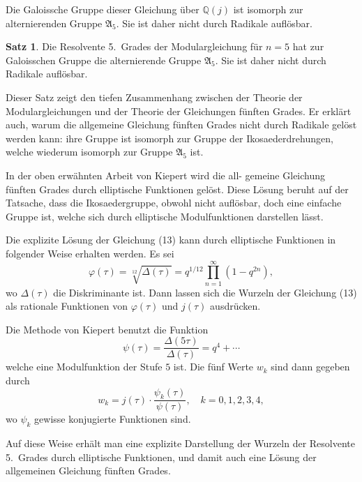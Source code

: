\documentclass[12pt,a4paper]{article}
\theoremstyle{definition}
\newtheorem*{satz}{Satz}
\begin{document}
Die Galoissche Gruppe dieser Gleichung \"uber $\mathbb{Q}(j)$ ist
isomorph zur alternierenden Gruppe $\mathfrak{A}_5$. Sie ist daher
nicht durch Radikale aufl\"osbar.

\begin{satz}
Die Resolvente 5.~Grades der Modulargleichung f\"ur $n = 5$
hat zur Galoisschen Gruppe die alternierende Gruppe $\mathfrak{A}_5$.
Sie ist daher nicht durch Radikale aufl\"osbar.
\end{satz}

Dieser Satz zeigt den tiefen Zusammenhang zwischen der
Theorie der Modulargleichungen und der Theorie der Gleichungen
f\"unften Grades. Er erkl\"art auch, warum die allgemeine Gleichung
f\"unften Grades nicht durch Radikale gel\"ost werden kann: ihre
Gruppe ist isomorph zur Gruppe der Ikosaederdrehungen, welche
wiederum isomorph zur Gruppe $\mathfrak{A}_5$ ist.

In der oben erw\"ahnten Arbeit von Kiepert wird die all-
gemeine Gleichung f\"unften Grades durch elliptische Funktionen
gel\"ost. Diese L\"osung beruht auf der Tatsache, dass die
Ikosaedergruppe, obwohl nicht aufl\"osbar, doch eine einfache
Gruppe ist, welche sich durch elliptische Modulfunktionen
darstellen l\"asst.

Die explizite L\"osung der Gleichung (13) kann durch
elliptische Funktionen in folgender Weise erhalten werden.
Es sei
\begin{equation}\tag{15}
\varphi(\tau) = \sqrt[12]{\Delta(\tau)} = q^{1/12} \prod_{n=1}^{\infty} (1 - q^{2n}),
\end{equation}
wo $\Delta(\tau)$ die Diskriminante ist. Dann lassen sich die
Wurzeln der Gleichung (13) als rationale Funktionen von
$\varphi(\tau)$ und $j(\tau)$ ausdr\"ucken.

Die Methode von Kiepert benutzt die Funktion
\begin{equation}\tag{16}
\psi(\tau) = \frac{\Delta(5\tau)}{\Delta(\tau)} = q^4 + \cdots
\end{equation}
welche eine Modulfunktion der Stufe $5$ ist. Die f\"unf Werte
$w_k$ sind dann gegeben durch
\begin{equation}\tag{17}
w_k = j(\tau) \cdot \frac{\psi_k(\tau)}{\psi(\tau)}, \quad k = 0, 1, 2, 3, 4,
\end{equation}
wo $\psi_k$ gewisse konjugierte Funktionen sind.

Auf diese Weise erh\"alt man eine explizite Darstellung der
Wurzeln der Resolvente 5.~Grades durch elliptische Funktionen,
und damit auch eine L\"osung der allgemeinen Gleichung f\"unften
Grades.
\end{document}
